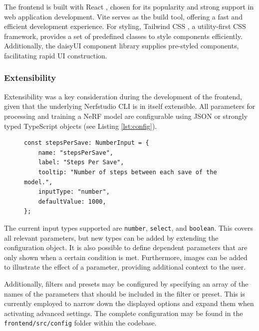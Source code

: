 The frontend is built with React \cite{noauthor_react_nodate}, chosen for its popularity and strong support in web application development.
Vite \cite{noauthor_vite_nodate} serves as the build tool, offering a fast and efficient development experience.
For styling, Tailwind CSS \cite{noauthor_tailwind_2020}, a utility-first CSS framework, provides a set of predefined classes to style components efficiently.
Additionally, the daisyUI \cite{noauthor_daisyui_nodate} component library supplies pre-styled components, facilitating rapid UI construction.

\subsubsection{Extensibility}

Extensibility was a key consideration during the development of the frontend, given that the underlying Nerfstudio CLI is in itself extensible.
All parameters for processing and training a NeRF model are configurable using JSON or strongly typed TypeScript objects (see Listing \ref{lst:config}).

\begin{figure}[htb]
\begin{lstlisting}[style=ES6, caption=Minimal parameter configuration for 'Steps Per Save' input., label=lst:config]
const stepsPerSave: NumberInput = {
	name: "stepsPerSave",
	label: "Steps Per Save",
	tooltip: "Number of steps between each save of the model.",
	inputType: "number",
	defaultValue: 1000,
};
\end{lstlisting}
\end{figure}

The current input types supported are \texttt{number}, \texttt{select}, and \texttt{boolean}. 
This covers all relevant parameters, but new types can be added by extending the configuration object. 
It is also possible to define dependent parameters that are only shown when a certain condition is met. 
Furthermore, images can be added to illustrate the effect of a parameter, providing additional context to the user.

Additionally, filters and presets may be configured by specifying an array of the names of the parameters that should be included in the filter or preset.
This is currently employed to narrow down the displayed options and expand them when activating advanced settings. 
The complete configuration may be found in the \texttt{frontend/src/config} folder within the codebase.

